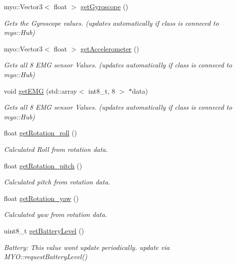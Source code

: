 \begin{DoxyCompactItemize}
myo\+::\+Vector3$<$ float $>$ \mbox{\hyperlink{class_data_collector_a04ad19d96b8574ff7c9f945cd1c5ddc6}{get\+Gyroscope}} ()
\begin{DoxyCompactList}\small\item\em Gets the Gyroscope values. (updates automatically if class is conneced to myo\+::\+Hub) \end{DoxyCompactList}\item 
myo\+::\+Vector3$<$ float $>$ \mbox{\hyperlink{class_data_collector_a1ef7a2beb37a42d4ac887fef90ac8947}{get\+Accelerometer}} ()
\begin{DoxyCompactList}\small\item\em Gets all 8 E\+MG sensor Values. (updates automatically if class is conneced to myo\+::\+Hub) \end{DoxyCompactList}\item 
void \mbox{\hyperlink{class_data_collector_a6994bc51d1e7cbcaeca954a4ba7f8103}{get\+E\+MG}} (std\+::array$<$ int8\+\_\+t, 8 $>$ $\ast$data)
\begin{DoxyCompactList}\small\item\em Gets all 8 E\+MG sensor Values. (updates automatically if class is conneced to myo\+::\+Hub) \end{DoxyCompactList}\item 
float \mbox{\hyperlink{class_data_collector_a4e761ba292f93b5ac18e05a860a697ab}{get\+Rotation\+\_\+roll}} ()
\begin{DoxyCompactList}\small\item\em Calculated Roll from rotation data. \end{DoxyCompactList}\item 
float \mbox{\hyperlink{class_data_collector_a603dbbfb9d59838c775f51e1e695e638}{get\+Rotation\+\_\+pitch}} ()
\begin{DoxyCompactList}\small\item\em Calculated pitch from rotation data. \end{DoxyCompactList}\item 
float \mbox{\hyperlink{class_data_collector_a45175c5352dd3870c2d1cf99c4b2d938}{get\+Rotation\+\_\+yaw}} ()
\begin{DoxyCompactList}\small\item\em Calculated yaw from rotation data. \end{DoxyCompactList}\item 
uint8\+\_\+t \mbox{\hyperlink{class_data_collector_a376b4be3194c56e25084df4097968a46}{get\+Battery\+Level}} ()
\begin{DoxyCompactList}\small\item\em Battery\+: This value wont update periodically. update via M\+Y\+O\+::request\+Battery\+Level() \end{DoxyCompactList}\item 

\end{DoxyCompactItemize}
